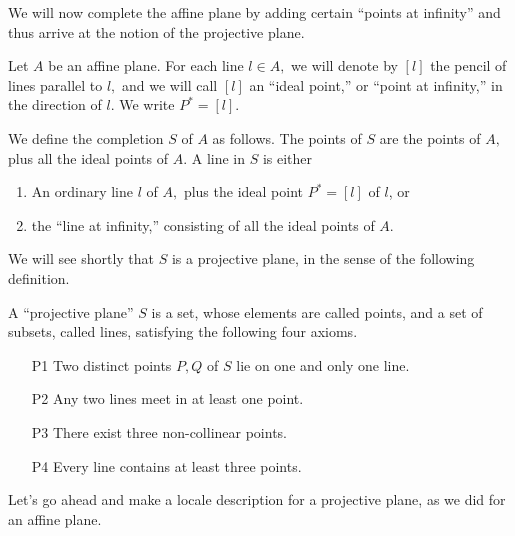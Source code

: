 \begin{isabellebody}
\begin{isamarkuptext}
\begin{hartshorne}
We will now complete the affine plane by adding certain ``points at infinity'' and thus arrive at 
the notion of the projective plane.

Let $A$ be an affine plane. For each line $l \in A,$ we will denote by $[l]$ the pencil of lines 
parallel to $l,$ and we will call $[l]$ an ``ideal point,'' or ``point at infinity,'' in the 
direction of $l.$ We write $P^{*} = [l]$.

We define the completion $S$ of $A$ as follows. The points of $S$ are the points of $A,$ plus all 
the ideal points of $A.$ A line in $S$ is either

\begin{enumerate}
\item An ordinary line $l$ of $A,$ plus the ideal point $P^{*} = [l]$ of $l$, or 
\item the ``line at infinity,'' consisting of all the ideal points of $A.$
\end{enumerate}

We will see shortly that $S$ is a projective plane, in the sense of the following definition.

 A ``projective plane'' $S$ is a set, whose elements are called points, 
and a set of subsets, called lines, satisfying the following four axioms.
\begin{enumerate}
\item[P1] Two distinct points $P, Q$ of $S$ lie on one and only one line. 
\item[P2] Any two lines meet in at least one point.
\item[P3] There exist three non-collinear points.
\item[P4] Every line contains at least three points.
\end{enumerate}

Let's go ahead and make a locale description for a projective plane, as we did for an affine plane. 


\end{hartshorne}
\end{isamarkuptext}
\end{isabellebody}
